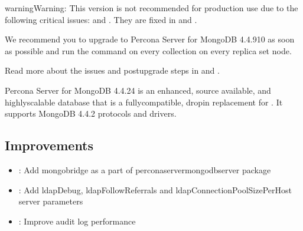 \documentclass[letterpaper,10pt,english]{sphinxmanual}
\begin{document}
\begin{sphinxadmonition}{warning}{Warning:}
\sphinxAtStartPar
This version is not recommended for production use due to the following critical issues:  and . They are fixed in  and {\hyperref[\detokenize{release_notes/4.4.9-10:psmdb-4-4-9-10}]{}}.

\sphinxAtStartPar
We recommend you to upgrade to Percona Server for MongoDB 4.4.9\sphinxhyphen{}10 as soon as possible and run the  command on every collection on every replica set node.

\sphinxAtStartPar
Read more about the issues and post\sphinxhyphen{}upgrade steps in  and .
\end{sphinxadmonition}

\sphinxAtStartPar
Percona Server for MongoDB 4.4.2\sphinxhyphen{}4 is an enhanced, source available, and highly\sphinxhyphen{}scalable database that is a
fully\sphinxhyphen{}compatible, drop\sphinxhyphen{}in replacement for .
It supports MongoDB 4.4.2 protocols and drivers.


\subsection{Improvements}
\label{\detokenize{release_notes/4.4.2-4:improvements}}\begin{itemize}
\item {} 
\sphinxAtStartPar
{}: Add mongobridge as a part of percona\sphinxhyphen{}server\sphinxhyphen{}mongodb\sphinxhyphen{}server package

\item {} 
\sphinxAtStartPar
{}: Add ldapDebug, ldapFollowReferrals and ldapConnectionPoolSizePerHost server parameters

\item {} 
\sphinxAtStartPar
{}: Improve audit log performance

\end{itemize}
\end{document}
